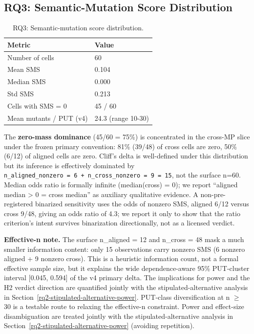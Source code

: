 \documentclass[review,12pt,authoryear]{elsarticle}
\begin{document}
\subsection{RQ3: Semantic-Mutation Score Distribution}\label{rq1-60-cell-distribution}

{\def\LTcaptype{table} %
\begin{longtable}[]{@{}ll@{}}
\caption{RQ3: Semantic-mutation score distribution.}\\
\toprule\noalign{}
Metric & Value \\
\midrule\noalign{}
\endhead
\bottomrule\noalign{}
\endlastfoot
Number of cells & 60 \\
Mean SMS & 0.104 \\
Median SMS & 0.000 \\
Std SMS & 0.213 \\
Cells with SMS = 0 & 45 / 60 \\
Mean mutants / PUT (v4) & 24.3 (range 10-30) \\
\end{longtable}
}

The \textbf{zero-mass dominance} (45/60 = 75\%) is concentrated in the
cross-MP slice under the frozen primary convention: 81\% (39/48) of
cross cells are zero,
50\% (6/12) of aligned cells are zero. Cliff's delta is
well-defined under this distribution but its inference is effectively
dominated by
\texttt{n\_aligned\_nonzero\ =\ 6\ +\ n\_cross\_nonzero\ =\ 9\ =\ 15}, not the
surface n=60. Median odds ratio is formally infinite (median(cross) =
0); we report ``aligned median \textgreater{} 0 = cross median'' as
auxiliary qualitative evidence. A non-pre-registered binarized
sensitivity uses the odds of nonzero SMS, aligned 6/12 versus cross
9/48, giving an odds ratio of 4.3; we report it only to show that the
ratio criterion's intent survives binarization directionally, not as a
licensed verdict.

\textbf{Effective-n note.} The surface n\_aligned = 12 and n\_cross = 48
mask a much smaller information content: only 15 observations carry
nonzero SMS (6 nonzero aligned + 9 nonzero cross). This is a heuristic
information count, not a formal effective sample size, but it explains the
wide dependence-aware 95\% PUT-cluster interval [0.045, 0.594] of the
v4 primary delta. The implications for power and the H2 verdict direction are
quantified jointly with the stipulated-alternative analysis in Section~\ref{rq2-stipulated-alternative-power}.
PUT-class diversification at n $\geq$ 30 is a testable route to relaxing
the effective-n constraint. Power and effect-size disambiguation are
treated jointly with the stipulated-alternative analysis in Section~\ref{rq2-stipulated-alternative-power}
(avoiding repetition).
\end{document}
